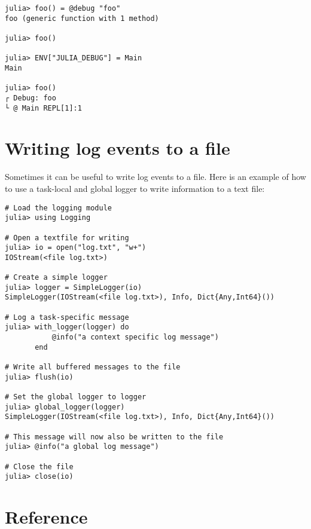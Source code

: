 \begin{verbatim}
julia> foo() = @debug "foo"
foo (generic function with 1 method)

julia> foo()

julia> ENV["JULIA_DEBUG"] = Main
Main

julia> foo()
┌ Debug: foo
└ @ Main REPL[1]:1

\end{verbatim}



\hypertarget{13723157150790493828}{}


\section{Writing log events to a file}



Sometimes it can be useful to write log events to a file. Here is an example of how to use a task-local and global logger to write information to a text file:




\begin{verbatim}
# Load the logging module
julia> using Logging

# Open a textfile for writing
julia> io = open("log.txt", "w+")
IOStream(<file log.txt>)

# Create a simple logger
julia> logger = SimpleLogger(io)
SimpleLogger(IOStream(<file log.txt>), Info, Dict{Any,Int64}())

# Log a task-specific message
julia> with_logger(logger) do
           @info("a context specific log message")
       end

# Write all buffered messages to the file
julia> flush(io)

# Set the global logger to logger
julia> global_logger(logger)
SimpleLogger(IOStream(<file log.txt>), Info, Dict{Any,Int64}())

# This message will now also be written to the file
julia> @info("a global log message")

# Close the file
julia> close(io)
\end{verbatim}



\hypertarget{15956208855154540711}{}


\section{Reference}



